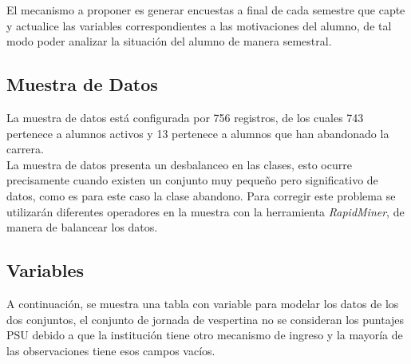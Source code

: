 El mecanismo a proponer es generar encuestas a final de cada semestre que capte y actualice las variables correspondientes a las motivaciones del alumno, de tal modo poder analizar la situación del alumno de manera semestral.\\


\subsection{Muestra de Datos}

La muestra de datos está configurada por 756 registros, de los cuales 743 pertenece a alumnos activos y 13 pertenece a alumnos que han abandonado la carrera.\\

La muestra de datos presenta un desbalanceo en las clases, esto ocurre precisamente cuando existen un conjunto muy pequeño pero significativo de datos, como es para este caso la clase abandono. Para corregir este problema se utilizarán diferentes operadores en la muestra con la herramienta \textit{RapidMiner}, de manera de balancear los datos.  


\subsection{Variables}

A continuación, se muestra una tabla con variable para modelar los datos de los dos conjuntos, el conjunto de jornada de vespertina no se consideran los puntajes PSU debido a que la institución tiene otro mecanismo de ingreso y la mayoría de las observaciones tiene esos campos vacíos.\\


